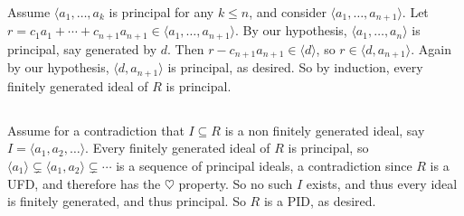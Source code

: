 \documentclass[11pt]{article}
\begin{document}
Assume $\langle a_1,\ldots,a_k$ is principal for any $k\le n$, and consider
$\langle a_1,\ldots,a_{n+1}\rangle$. Let
$r=c_1a_1+\cdots+c_{n+1}a_{n+1}\in\langle a_1,\ldots,a_{n+1}\rangle$. By our
hypothesis, $\langle a_1,\ldots,a_n\rangle$ is principal, say generated by
$d$. Then $r-c_{n+1}a_{n+1}\in\langle d\rangle$, so $r\in\langle
d,a_{n+1}\rangle$. Again by our hypothesis, $\langle d,a_{n+1}\rangle$ is
principal, as desired. So by induction, every finitely generated ideal of $R$
is principal.


\subsection{} %
Assume for a contradiction that $I\subseteq R$ is a non finitely generated
ideal, say $I=\langle a_1,a_2,\ldots\rangle$. Every finitely generated ideal
of $R$ is principal, so $\langle a_1\rangle\subsetneq\langle
a_1,a_2\rangle\subsetneq\cdots$ is a sequence of principal ideals, a
contradiction since $R$ is a UFD, and therefore has the $\heartsuit$ property.
So no such $I$ exists, and thus every ideal is finitely generated, and thus
principal. So $R$ is a PID, as desired.
\end{document}
